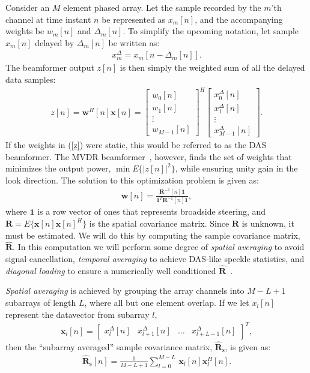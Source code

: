 \documentclass[12pt,journal,captionsoff,onecolumn]{IEEEtran}
\newcommand\bmat[1]{\begin{bmatrix}#1\end{bmatrix}}
\newcommand\sumb[2]{\sum\limits_{#1}^{#2}\,}
\newcommand\T{^{\scriptscriptstyle T}}
\renewcommand\H{^{\scriptscriptstyle H}}
\renewcommand\vec[1]{\boldsymbol{#1}}
\newcommand\mat[1]{\boldsymbol{#1}}
\newcommand\1{\vec 1}
\newcommand*\w{\vec w}
\newcommand*\x{\vec x}
\newcommand*\R{\mat R}
\newcommand*\Ri{\R^{-1}}
\newcommand*\eR{\mat{\hat R}}
\begin{document}
Consider an $M$ element phased array. Let the sample recorded by the $m$'th channel at time instant $n$ be represented as $x_m[n]$, and the accompanying weights be  $w_m[n]$ and $\Delta_m[n]$. To simplify the upcoming notation, let sample $x_m[n]$ delayed by $\Delta_m[n]$ be written as:
\begin{align}
x^\Delta_m = x_m[n-\Delta_m[n]].
\end{align}
The beamformer output $z[n]$ is then simply the weighted sum of all the delayed data samples:
\begin{align}
z[n] = \w\H[n]\x[n] = \bmat{w_0[n]\\w_1[n]\\\vdots\\w_{M-1}[n]}^H \bmat{x^\Delta_0[n]\\x^\Delta_1[n]\\\vdots\\x^\Delta_{M-1}[n]}.\label{z}
\end{align}
If the weights in (\ref{z}) were static, this would be referred to as the \gls{DAS} beamformer. The \gls{MVDR} beamformer~\cite{Capon1969}, however, finds the set of weights that minimizes the output power, $\min E\{|z[n]|^2\}$, while ensuring unity gain in the look direction. The solution to this optimization problem is given as:
\begin{gather}
\vec w[n] = \frac{\Ri[n]\1}{\1\T\Ri[n]\1},\label{weights}
\end{gather}
where $\1$ is a row vector of ones that represents broadside steering, and $\R=E\{\x[n]\x[n]\H\}$ is the spatial covariance matrix. Since $\R$ is unknown, it must be estimated. We will do this by computing the sample covariance matrix, $\eR$. In this computation we will perform some degree of \emph{spatial averaging} to avoid signal cancellation, \emph{temporal averaging} to achieve \gls{DAS}-like speckle statistics, and \emph{diagonal loading} to ensure a numerically well conditioned $\eR$~\cite{Synnevag2009a}.

\emph{Spatial averaging} is achieved by grouping the array channels into $M-L+1$ subarrays of length $L$, where all but one element overlap. If we let $x_l[n]$ represent the datavector from subarray $l$,
\begin{gather}
\x_l[n] = \bmat{x^\Delta_l[n] & x^\Delta_{l+1}[n] & \dots & x^\Delta_{l+L-1}[n]}\T,
\end{gather}
then the ``subarray averaged'' sample covariance matrix, $\eR_\text{s}$, is given as:
\begin{gather}
\eR_\text{s}[n] = \frac{1}{M-L+1} \sumb{l=0}{M-L} \x_l[n]\x_l\H[n].\label{spatialR}
\end{gather}
\end{document}
